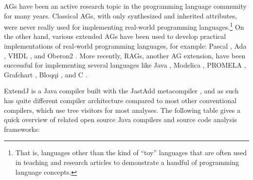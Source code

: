 \documentclass[10pt, twoside, openright]{book}
\begin{document}


AGs have been an active research topic in the programming language community
for many years. Classical AGs, with only synthesized and inherited attributes,
were never really used for implementing real-world
programming languages.\footnote{That is, languages other than
the kind of ``toy'' languages that are often used in teaching and research
articles to demonstrate a handful of programming language concepts.}
On the other hand, various extended AGs have been used to develop practical implementations of
real-world programming languages, for example:
Pascal \cite{DBLP:books/sp/KastensHZ82},
Ada \cite{DBLP:books/sp/UhlDP82},
VHDL \cite{DBLP:conf/pldi/FarrowS89}, and Oberon2 \cite{boyland1996descriptional}.
More recently, RAGs, another AG extension, have been successful for implementing several
languages like
Java \cite{jastaddj,DBLP:conf/ecoop/WykKBS07},
Modelica \cite{DBLP:journals/cce/AkessonAGBT10},
PROMELA \cite{DBLP:conf/spin/MaliW11},
Grafchart \cite{theorin2012rewriting},
Bloqqi \cite{DBLP:conf/oopsla/ForsH16},
and C \cite{DBLP:journals/pacmpl/KaminskiKCW17}.

ExtendJ is a Java compiler built with the JastAdd metacompiler \cite{DBLP:journals/scp/HedinM03},
and as such has quite different compiler
architecture compared to most other conventional compilers, which use tree visitors for
most analyses.
The following table gives a quick
overview of related open source Java compilers and source code analysis frameworks:

\vspace{1em}
\end{document}
